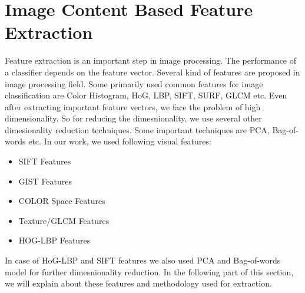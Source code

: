 \section{Image Content Based Feature Extraction}
Feature extraction is an important step in image processing. The performance of a classifier depends on the feature vector. Several kind of features are proposed in image processing field. Some primarily used common features for image classification are Color Histogram, HoG, LBP, SIFT, SURF, GLCM etc. Even after extracting important feature vectors, we face the problem of high dimensionality. So for reducing the dimesnionality, we use several other dimesionality reduction techniques. Some important techniques are PCA, Bag-of-words etc. In our work,  we used following visual features:
\begin{itemize}
\item SIFT Features
\item GIST Features
\item COLOR Space Features
\item Texture/GLCM Features
\item HOG-LBP Features
\end{itemize}
In case of HoG-LBP and SIFT features we also used PCA and Bag-of-words model for further dimesnionality reduction. In the following part of this section, we will explain about these features and methodology used for extraction.
